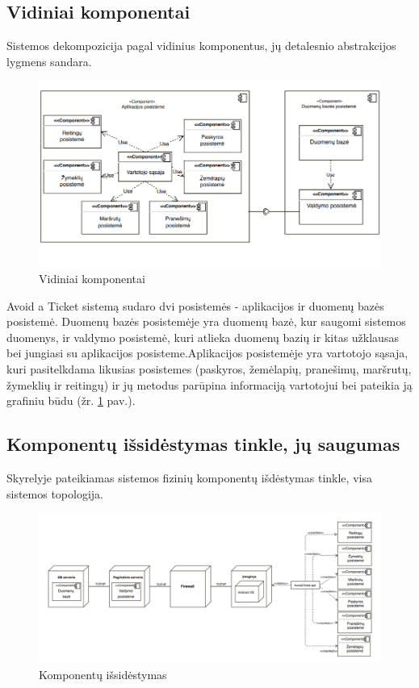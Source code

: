 \documentclass{VUMIFPSkursinis}
\begin{document}
\subsection{Vidiniai komponentai}
Sistemos dekompozicija pagal vidinius komponentus, jų detalesnio abstrakcijos lygmens sandara.
\begin{figure}[H]
	\centering
	\includegraphics[scale=0.7]{img/Vidiniai_komponentai}
	\caption{Vidiniai komponentai}
	\label{img:Vidiniai komponentai}
\end{figure}

Avoid a Ticket sistemą sudaro dvi posistemės - aplikacijos ir duomenų bazės posistemė. Duomenų bazės posistemėje yra duomenų bazė, kur saugomi sistemos duomenys, ir valdymo posistemė, kuri atlieka duomenų bazių ir kitas užklausas bei jungiasi su aplikacijos posisteme.Aplikacijos posistemėje yra vartotojo sąsaja, kuri pasitelkdama likusias posistemes (paskyros, žemėlapių, pranešimų, maršrutų, žymeklių ir reitingų) ir jų metodus parūpina informaciją vartotojui bei pateikia ją grafiniu būdu (žr. \ref{img:Vidiniai komponentai} pav.).

\subsection{Komponentų išsidėstymas tinkle, jų saugumas}
Skyrelyje pateikiamas sistemos fizinių komponentų išdėstymas tinkle, visa sistemos topologija.

\begin{figure}[H]
	\centering
	\includegraphics[scale=0.4]{img/Komponentu_issidestymas}
	\caption{Komponentų išsidėstymas}
	\label{img:išsidėstymas}
\end{figure}
\end{document}
